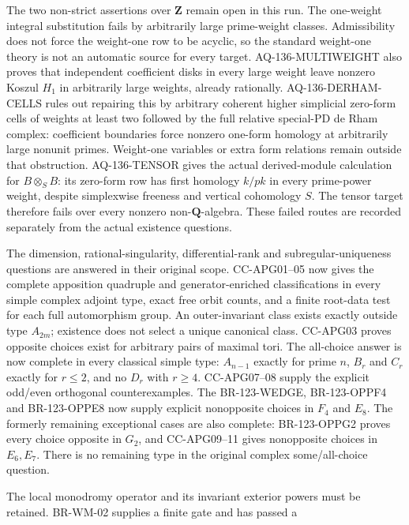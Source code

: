 \begin{description}[style=nextline,leftmargin=0pt]
The two non-strict assertions over $\mathbf Z$ remain open in this
run. The one-weight integral substitution fails by arbitrarily large
prime-weight classes. Admissibility does not force the weight-one
row to be acyclic, so the standard weight-one theory is not an
automatic source for every target. AQ-136-MULTIWEIGHT also proves
that independent coefficient disks in every large weight leave nonzero
Koszul $H_1$ in arbitrarily large weights, already rationally.
AQ-136-DERHAM-CELLS rules out repairing this by arbitrary coherent
higher simplicial zero-form cells of weights at least two followed
by the full relative special-PD de Rham complex: coefficient
boundaries force nonzero one-form homology at arbitrarily large
nonunit primes. Weight-one variables or extra form relations
remain outside that obstruction.
AQ-136-TENSOR gives the actual derived-module calculation for
$B\otimes_S B$: its zero-form row has first homology $k/pk$
in every prime-power weight, despite simplexwise freeness and vertical
cohomology $S$. The tensor target therefore fails over every nonzero
non-$\mathbf Q$-algebra. These failed routes are recorded
separately from the actual existence questions.
\item[Cote 123: the original apposition questions are now closed.]
The dimension, rational-singularity, differential-rank and
subregular-uniqueness questions are answered in their original scope.
CC-APG01--05 now gives the complete apposition quadruple and
generator-enriched classifications in every simple complex adjoint
type, exact free orbit counts, and a finite root-data test for each
full automorphism group. An outer-invariant class exists exactly
outside type $A_{2m}$; existence does not select a unique canonical
class. CC-APG03 proves opposite choices exist for arbitrary pairs of
maximal tori. The all-choice answer is now complete in every classical simple
type: $A_{n-1}$ exactly for prime $n$, $B_r$ and $C_r$ exactly
for $r\leq2$, and no $D_r$ with $r\geq4$. CC-APG07--08
supply the explicit odd/even orthogonal counterexamples. The
BR-123-WEDGE, BR-123-OPPF4 and BR-123-OPPE8 now supply
explicit nonopposite choices in $F_4$ and $E_8$.  The formerly remaining
exceptional cases are also complete: BR-123-OPPG2 proves every
choice opposite in $G_2$, and CC-APG09--11 gives nonopposite
choices in $E_6,E_7$. There is no remaining type in the original
complex some/all-choice question.
\item[Weight--monodromy and universal-curve categories.]
The local monodromy operator and its invariant exterior powers must
be retained. BR-WM-02 supplies a finite gate and has passed a

\end{description}

